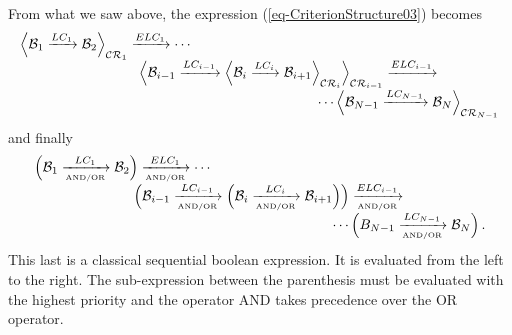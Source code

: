 \documentclass[a4paper,11pt] {ivoa}
\begin{document}
From what we saw above, the expression (\ref{eq-CriterionStructure03}) becomes
\begin{equation}
\begin{array}{l}
\displaystyle \Big \langle \mathcal B_1 \xrightarrow{LC_1}  \mathcal B_2 \Big \rangle_{\mathcal{CR}_1} 
\xrightarrow{ELC_1}  \cdots \\
\displaystyle \hspace{3cm} \Big \langle \mathcal B_{i-1}  \xrightarrow{LC_{i-1}} \Big \langle \mathcal B_i 
 \xrightarrow{LC_i} \mathcal B_{i+1} \Big \rangle_{\mathcal{CR}_i} \Big \rangle_{\mathcal{CR}_{i-1}}  \xrightarrow{ELC_{i-1}}  \\
\displaystyle \hspace{7.5cm} \cdots  \Big \langle  \mathcal B_{N-1}   \xrightarrow{LC_{N-1}} \mathcal B_N  \Big \rangle_{\mathcal{CR}_{N-1}}
\end{array}
\end{equation}
and finally
\begin{equation}
\begin{array}{l}
\displaystyle \Big ( \mathcal B_1 \xrightarrow[{\mbox{\tiny AND/OR}}]{LC_1}  \mathcal B_2 \Big ) \xrightarrow[{\mbox{\tiny AND/OR}}]{ELC_1}  \cdots \\
\displaystyle \hspace{2.5cm} \Big ( \mathcal B_{i-1} \xrightarrow[{\mbox{\tiny AND/OR}}]{LC_{i-1}} \Big (
\mathcal B_i \xrightarrow[{\mbox{\tiny AND/OR}}]{LC_i} \mathcal B_{i+1} \Big) \Big )  \xrightarrow[{\mbox{\tiny AND/OR}}]{ELC_{i-1}}  \\
\displaystyle  \hspace{7.5cm}  \cdots \Big (   B_{N-1}   \xrightarrow[{\mbox{\tiny AND/OR}}]{LC_{N-1}} \mathcal B_N \Big ) \,. \\
\end{array}
\end{equation}
This last is a classical sequential boolean expression. It is evaluated from the left to the right.
The sub-expression between the parenthesis must be evaluated with the highest priority and the
operator AND takes precedence over the OR operator.
\end{document}
